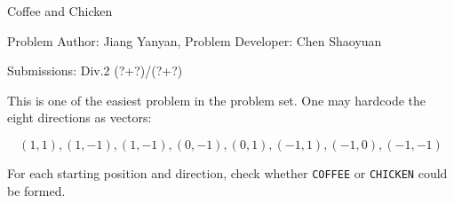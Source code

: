 \begin{Solution}{Coffee and Chicken}

\begin{frame}{\ProblemName}

\small Problem Author: Jiang Yanyan, Problem Developer: Chen Shaoyuan \par \vspace{0.3cm}

\small Submissions: Div.2 (?+?)/(?+?) \par \vspace{0.5cm}

This is one of the easiest problem in the problem set. One may hardcode the eight directions as vectors: 

$$(1, 1), (1, -1), (1, -1), (0, -1), (0, 1), (-1, 1), (-1, 0), (-1, -1)$$

For each starting position and direction, check whether \texttt{COFFEE} or \texttt{CHICKEN} could be formed.

\end{frame}

\end{Solution}

